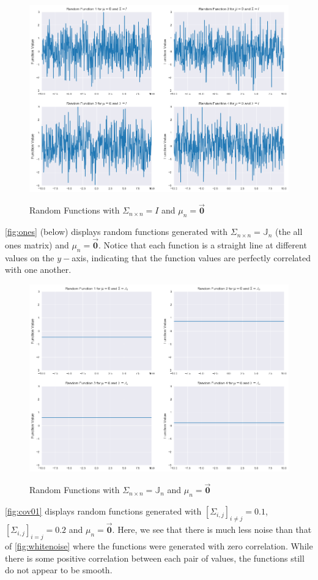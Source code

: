 \documentclass[twoside,11pt]{homework}
\DeclarePairedDelimiter{\2norm}{\lVert}{\rVert^2_2}
\newcommand{\1}[1]{\mathds{1}\left[#1\right]}
\begin{document}
\begin{figure}[H]
\centering
\caption{Random Functions with $\Sigma_{n \times n} = I$ and $\mu_{n} = \bm{\vec{0}}$}
\includegraphics[scale=0.4]{"../code/figures/part_v_whitenoise"}
\label{fig:whitenoise}
\end{figure}

\noindent
\autoref{fig:ones} (below) displays random functions generated with $\Sigma_{n \times n} = \mathbb{J}_{n}$ (the all ones matrix) and $\mu_{n} = \bm{\vec{0}}$. Notice that each function is a straight line at different values on the $y-$axis, indicating that the function values are perfectly correlated with one another.

\begin{figure}[H]
\centering
\caption{Random Functions with $\Sigma_{n \times n} = \mathbb{J}_{n}$ and $\mu_{n} = \bm{\vec{0}}$}
\includegraphics[scale=0.4]{"../code/figures/part_v_correlated"}
\label{fig:ones}
\end{figure}
\noindent
\autoref{fig:cov01} displays random functions generated with $[\Sigma_{i,j}]_{i \neq j} = 0.1$, $[\Sigma_{i,j}]_{i = j} = 0.2$ and $\mu_{n} = \bm{\vec{0}}$. Here, we see that there is much less noise than that of \autoref{fig:whitenoise} where the functions were generated with zero correlation. While there is some positive correlation between each pair of values, the functions still do not appear to be smooth.
\end{document}
